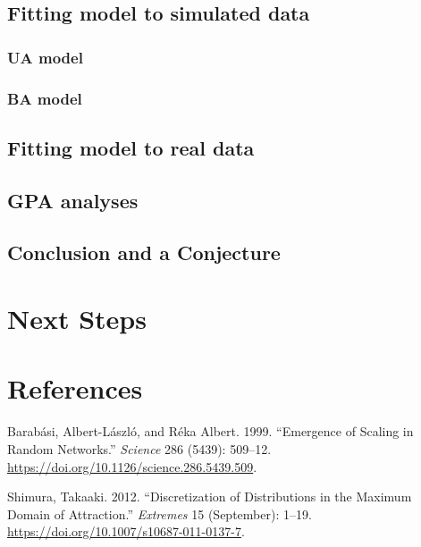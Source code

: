 \documentclass[
  10pt,
  a4paper,
]{scrreprt}
\newlength{\cslhangindent}
\newlength{\cslentryspacingunit} %
\newenvironment{CSLReferences}[2] %
 {%
  \setlength{\parindent}{0pt}
  \ifodd #1
  \let\oldpar\par
  \def\par{\hangindent=\cslhangindent\oldpar}
  \fi
  \setlength{\parskip}{#2\cslentryspacingunit}
 }%
 {}
\theoremstyle{definition}
\theoremstyle{plain}
\theoremstyle{remark}
\begin{document}
{\hypertarget{fitting-model-to-simulated-data}{%
\section{Fitting model to simulated
data}\label{fitting-model-to-simulated-data}}

\hypertarget{ua-model}{%
\subsection{UA model}\label{ua-model}}

\hypertarget{ba-model}{%
\subsection{BA model}\label{ba-model}}

\hypertarget{fitting-model-to-real-data}{%
\section{Fitting model to real data}\label{fitting-model-to-real-data}}

\hypertarget{gpa-analyses}{%
\section{GPA analyses}\label{gpa-analyses}}

\hypertarget{conclusion-and-a-conjecture}{%
\section{Conclusion and a
Conjecture}\label{conclusion-and-a-conjecture}}

\hypertarget{next-steps}{%
\chapter{Next Steps}\label{next-steps}}

\newpage{}

\hypertarget{references}{%
\chapter*{References}\label{references}}

\hypertarget{refs}{}
\begin{CSLReferences}{1}{0}
\leavevmode{}%
Barabási, Albert-László, and Réka Albert. 1999. {``Emergence of Scaling
in Random Networks.''} \emph{Science} 286 (5439): 509--12.
\url{https://doi.org/10.1126/science.286.5439.509}.

\leavevmode{}%
Shimura, Takaaki. 2012. {``Discretization of Distributions in the
Maximum Domain of Attraction.''} \emph{Extremes} 15 (September): 1--19.
\url{https://doi.org/10.1007/s10687-011-0137-7}.

\end{CSLReferences}
\end{document}
